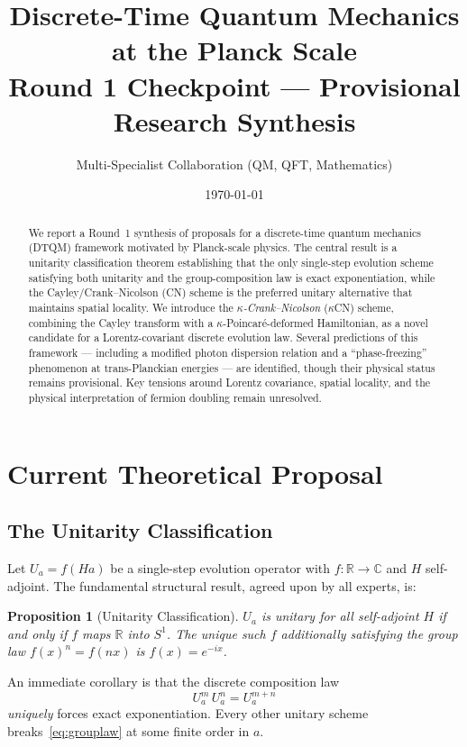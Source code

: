 \documentclass[11pt,a4paper]{article}
\title{\textbf{Discrete-Time Quantum Mechanics at the Planck Scale}\\
\large Round 1 Checkpoint — Provisional Research Synthesis}
\author{Multi-Specialist Collaboration (QM, QFT, Mathematics)}
\date{\today}
\newtheorem{proposition}{Proposition}
\begin{document}
\maketitle

\begin{abstract}
We report a Round~1 synthesis of proposals for a discrete-time quantum mechanics (DTQM) framework motivated by Planck-scale physics. The central result is a unitarity classification theorem establishing that the only single-step evolution scheme satisfying both unitarity and the group-composition law is exact exponentiation, while the Cayley/Crank--Nicolson (CN) scheme is the preferred unitary alternative that maintains spatial locality. We introduce the \emph{$\kappa$-Crank--Nicolson} ($\kappa$CN) scheme, combining the Cayley transform with a $\kappa$-Poincar\'{e}-deformed Hamiltonian, as a novel candidate for a Lorentz-covariant discrete evolution law. Several predictions of this framework --- including a modified photon dispersion relation and a ``phase-freezing'' phenomenon at trans-Planckian energies --- are identified, though their physical status remains provisional. Key tensions around Lorentz covariance, spatial locality, and the physical interpretation of fermion doubling remain unresolved.
\end{abstract}

\tableofcontents

\section{Current Theoretical Proposal}
\label{sec:proposal}

\subsection{The Unitarity Classification}

Let $U_a = f(Ha)$ be a single-step evolution operator with $f:\mathbb{R}\to\mathbb{C}$ and $H$ self-adjoint. The fundamental structural result, agreed upon by all experts, is:

\begin{proposition}[Unitarity Classification]
$U_a$ is unitary for all self-adjoint $H$ if and only if $f$ maps $\mathbb{R}$ into $S^1$. The unique such $f$ additionally satisfying the group law $f(x)^n = f(nx)$ is $f(x) = e^{-ix}$.
\end{proposition}

An immediate corollary is that the discrete composition law
\begin{equation}
  U_a^m\, U_a^n = U_a^{m+n}
  \label{eq:grouplaw}
\end{equation}
\emph{uniquely} forces exact exponentiation. Every other unitary scheme breaks~\eqref{eq:grouplaw} at some finite order in $a$.
\end{document}
